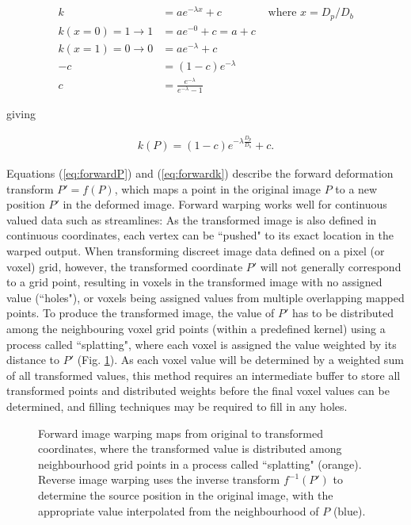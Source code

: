 \begin{align}
  k &= a e^{-\lambda x} + c &\text{ where } x = D_p / D_b \nonumber \\
  k(x=0)=1 \longrightarrow 1 &= a e^{-0} + c = a + c \nonumber \\
  k(x=1)=0 \longrightarrow 0 &= a e^{-\lambda} + c \nonumber \\
  -c &= (1-c) e^{-\lambda} \nonumber \\
  c &= \frac{e^{-\lambda}}{e^{-\lambda} - 1} \label{eq:c}
\end{align}

giving

\begin{align}\label{eq:forwardk}
  k(P) = (1-c)e^{-\lambda \frac{D_p}{D_b}} +c.
\end{align}

Equations (\ref{eq:forwardP}) and (\ref{eq:forwardk}) describe the forward deformation transform $P'=f(P)$, which maps a point in the original image $P$ to a new position $P'$ in the deformed image.
Forward warping works well for continuous valued data such as streamlines:
As the transformed image is also defined in continuous coordinates, each vertex can be ``pushed" to its exact location in the warped output.
When transforming discreet image data defined on a pixel (or voxel) grid, however, the transformed coordinate $P'$ will not generally correspond to a grid point, resulting in voxels in the transformed image with no assigned value (``holes"), or voxels being assigned values from multiple overlapping mapped points.
To produce the transformed image, the value of $P'$ has to be distributed among the neighbouring voxel grid points (within a predefined kernel) using a process called ``splatting",\autocite{Niklaus2020} where each voxel is assigned the value weighted by its distance to $P'$ (Fig. \ref{fig:warp}).
As each voxel value will be determined by a weighted sum of all transformed values, this method requires an intermediate buffer to store all transformed points and distributed weights before the final voxel values can be determined, and filling techniques may be required to fill in any holes.

\begin{figure}[h!]
  \centering
  
  \caption{Forward image warping maps from original to transformed coordinates, where the transformed value is distributed among neighbourhood grid points in a process called ``splatting" (orange). Reverse image warping uses the inverse transform $f^{-1}(P')$ to determine the source position in the original image, with the appropriate value interpolated from the neighbourhood of $P$ (blue).}
  \label{fig:warp}
\end{figure}

